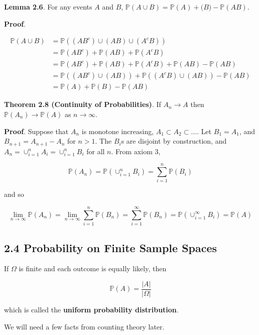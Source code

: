 \textbf{Lemma 2.6}. For any events \(A\) and \(B\),
\(\mathbb{P}(A \cup B) = \mathbb{P}(A) + \mathbb(B) - \mathbb{P}(AB)\).

\textbf{Proof}.

\begin{align*}
\mathbb{P}(A \cup B) 
&= \mathbb{P}\left( (AB^{c}) \cup (AB) \cup (A^{c}B) \right) 
\\
&= \mathbb{P}(AB^{c}) + \mathbb{P}(AB) + \mathbb{P}(A^{c}B) 
\\
&= \mathbb{P}(AB^{c}) + \mathbb{P}(AB) + \mathbb{P}(A^{c}B) + \mathbb{P}(AB) - \mathbb{P}(AB) 
\\
&= \mathbb{P}((AB^{c}) \cup (AB)) + \mathbb{P}((A^{c}B) \cup (AB)) - \mathbb{P}(AB) 
\\
&= \mathbb{P}(A) + \mathbb{P}(B) - \mathbb{P}(AB)
\end{align*}

\textbf{Theorem 2.8 (Continuity of Probabilities)}. If
\(A_{n} \rightarrow A\) then \(\mathbb{P}(A_{n}) \rightarrow \mathbb{P}(A)\)
as \(n \rightarrow \infty\).

\textbf{Proof}. Suppose that \(A_{n}\) is monotone increasing,
\(A_{1} \subset A_{2} \subset \dots\). Let \(B_{1} = A_{1}\), and
\(B_{n+1} = A_{n+1} - A_{n}\) for \(n > 1\). The \(B_{i}\)s are disjoint by
construction, and \(A_{n} = \cup_{i=1}^{n} A_{i} = \cup_{i=1}^{n} B_{i}\) for all
\(n\). From axiom 3,

\[ \mathbb{P}(A_{n}) = \mathbb{P}\left( \cup_{i=1}^{n} B_{i} \right)  = \sum_{i=1}^{n} \mathbb{P}(B_{i}) \]

and so

\[ \lim_{n \rightarrow \infty} \mathbb{P}(A_{n}) = \lim_{n \rightarrow \infty} \sum_{i=1}^{n} \mathbb{P}(B_{n}) = \sum_{i=1}^{\infty} \mathbb{P}(B_{n}) = \mathbb{P}\left( \cup_{i=1}^{\infty} B_{i} \right) = \mathbb{P}(A) \]

\subsection*{2.4 Probability on Finite Sample Spaces}\label{probability:samples}

If \(\Omega\) is finite and each outcome is equally likely, then

\[ \mathbb{P}(A) = \frac{|A|}{|\Omega|} \]

which is called the \textbf{uniform probability distribution}.

We will need a few facts from counting theory later.

